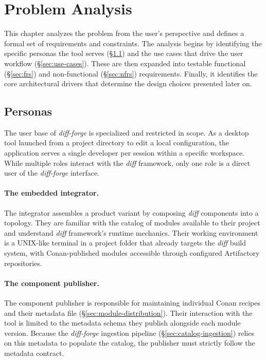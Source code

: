 \clearpage
\section{Problem Analysis}

This chapter analyzes the problem from the user's perspective and defines a formal set of requirements and constraints. The analysis begins by identifying the specific personas the tool serves (\S\ref{sec:personas}) and the use cases that drive the user workflow (\S\ref{sec:use-cases}). These are then expanded into testable functional (\S\ref{sec:frs}) and non-functional (\S\ref{sec:nfrs}) requirements. Finally, it identifies the core architectural drivers that determine the design choices presented later on.

\subsection{Personas}
\label{sec:personas}

The user base of \textit{diff-forge} is specialized and restricted in scope. As a desktop tool launched from a project directory to edit a local configuration, the application serves a single developer per session within a specific workspace. While multiple roles interact with the \textit{diff} framework, only one role is a direct user of the \textit{diff-forge} interface.

\paragraph{The embedded integrator.}
The integrator assembles a product variant by composing \textit{diff} components into a topology. They are familiar with the catalog of modules available to their project and understand \textit{diff} framework's runtime mechanics. Their working environment is a UNIX-like terminal in a project folder that already targets the \textit{diff} build system, with Conan-published modules accessible through configured Artifactory repositories.

\paragraph{The component publisher.}
The component publisher is responsible for maintaining individual Conan recipes and their metadata file (\S\ref{sec:module-distribution}). Their interaction with the tool is limited to the metadata schema they publish alongside each module version. Because the \textit{diff-forge} ingestion pipeline (\S\ref{sec:catalog-ingestion}) relies on this metadata to populate the catalog, the publisher must strictly follow the metadata contract.

